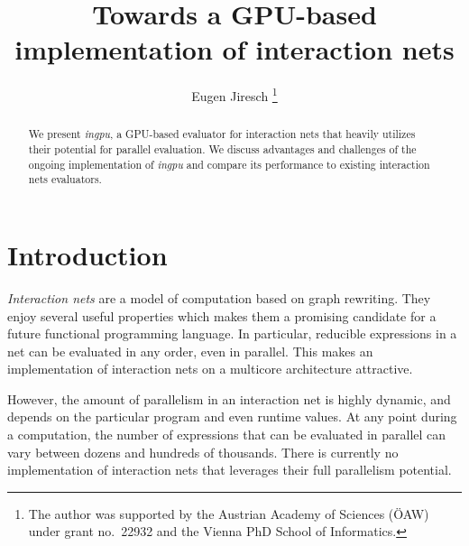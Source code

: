 \documentclass[submission,copyright,creativecommons]{eptcs}
\title{Towards a GPU-based implementation of interaction nets}
\author{Eugen Jiresch \thanks{The author was supported by the
Austrian Academy of Sciences (\"OAW) under grant no.\ 22932 and the Vienna PhD School of
Informatics.}
\institute{Institut f\"ur Computersprachen, Technische Universit\"at Wien, Favoritenstra{\ss}e 9-11, 1040 Wien, Austria}
\email{jiresch@logic.at}}
\begin{document}
\lstset{language=C++,
		basicstyle=\ttfamily,
		mathescape=true
		}

\maketitle

\begin{abstract}
We present \emph{ingpu}, a GPU-based evaluator for interaction nets that
heavily utilizes their potential for parallel evaluation.
We discuss advantages and challenges of the ongoing implementation of
\emph{ingpu} and compare its performance to existing interaction nets
evaluators.
\end{abstract}



\section{Introduction}
\label{sec:introduction}

\emph{Interaction nets} are a model of computation based on graph
rewriting.
They enjoy several useful properties
which makes them a promising candidate for a future functional programming
language. In particular, reducible expressions in a net can be evaluated in any
order, even in parallel. This makes an implementation of interaction nets on a
multicore architecture attractive.

However, the amount of parallelism in an interaction net is highly dynamic,
and depends on the particular program and even runtime values. At any point
during a computation, the number of expressions that can be evaluated in
parallel can vary between dozens and hundreds of thousands. There is currently
no implementation of interaction nets that leverages their full parallelism
potential.
\end{document}

